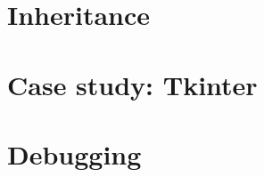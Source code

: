 \documentclass[10pt]{book}
\newcommand{\EN}{\color{red} \normalsize}
\newcommand{\UN}{\color{black}\normalsize}
\begin{document}
\chapter{Inheritance}

\EN
\chapter{Case study: Tkinter}

\UN
\appendix
\EN
\chapter{Debugging}

\UN
\printindex

\clearemptydoublepage
\end{document}
